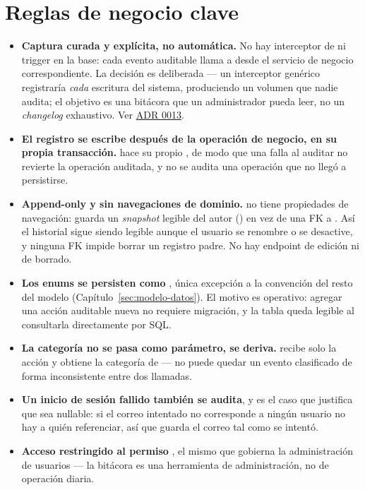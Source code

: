 \section{Reglas de negocio clave}
\label{sec:auditoria-reglas}

\begin{itemize}
  \item \textbf{Captura curada y explícita, no automática.} No hay interceptor de  ni trigger en la base: cada evento auditable llama a \allowbreak {}\allowbreak {}\allowbreak {}\allowbreak {} desde el servicio de negocio correspondiente. La decisión es deliberada --- un interceptor genérico registraría \emph{cada} escritura del sistema, produciendo un volumen que nadie audita; el objetivo es una bitácora que un administrador pueda leer, no un \emph{changelog} exhaustivo. Ver \hyperref[adr:0013]{ADR 0013}.
  \item \textbf{El registro se escribe después de la operación de negocio, en su propia transacción.}  hace su propio , de modo que una falla al auditar no revierte la operación auditada, y no se audita una operación que no llegó a persistirse.
  \item \textbf{Append-only y sin navegaciones de dominio.} \allowbreak {} no tiene propiedades de navegación: guarda un \emph{snapshot} legible del autor (\allowbreak {}) en vez de una FK a . Así el historial sigue siendo legible aunque el usuario se renombre o se desactive, y ninguna FK impide borrar un registro padre. No hay endpoint de edición ni de borrado.
  \item \textbf{Los enums se persisten como }, única excepción a la convención \allowbreak {} del resto del modelo (Capítulo~\ref{sec:modelo-datos}). El motivo es operativo: agregar una acción auditable nueva no requiere migración, y la tabla queda legible al consultarla directamente por SQL.
  \item \textbf{La categoría no se pasa como parámetro, se deriva.}  recibe solo la acción y obtiene la categoría de \allowbreak {} --- no puede quedar un evento clasificado de forma inconsistente entre dos llamadas.
  \item \textbf{Un inicio de sesión fallido también se audita}, y es el caso que justifica que  sea nullable: si el correo intentado no corresponde a ningún usuario no hay a quién referenciar, así que \allowbreak {} guarda el correo tal como se intentó.
  \item \textbf{Acceso restringido al permiso }, el mismo que gobierna la administración de usuarios --- la bitácora es una herramienta de administración, no de operación diaria.
\end{itemize}

